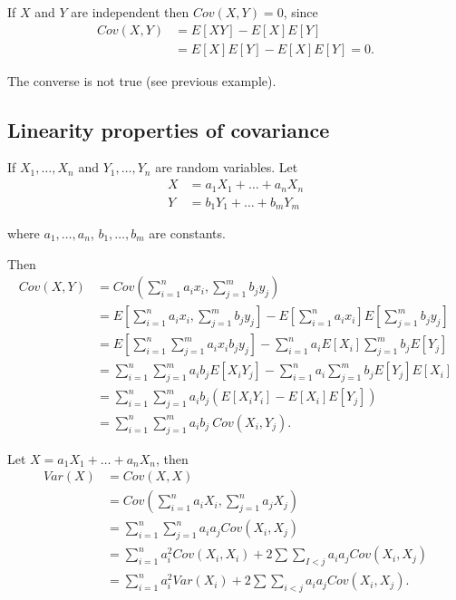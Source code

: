 
If $X$ and $Y$ are independent then $Cov\left( X, Y \right) = 0$, since 
\begin{align*}
	Cov\left( X, Y \right) &= E\left[ XY \right] - E\left[ X \right] E\left[ Y \right]  \\
	&= E\left[ X \right] E\left[ Y \right] - E\left[ X \right]E\left[ Y \right] = 0  
.\end{align*}

The converse is not true (see previous example).

\subsection{Linearity properties of covariance}

If $X_{1} , \ldots , X_{n}$ and $Y_{1} , \ldots , Y_{n}$ are random variables. Let 
\begin{align*}
	X &= a_1 X_1 + \ldots + a_n X_n \\
	Y &= b_1 Y_1 + \ldots + b_{m} Y_{m} 
\end{align*}

where $a_{1} , \ldots , a_{n}$, $b_{1} , \ldots , b_{m}$ are constants. 

Then 
\begin{align*}
	Cov\left( X, Y \right) &= Cov\left( \sum_{i=1}^{n} a_i x_i , \sum_{j=1}^{m} b_{j}y_{j} \right)  \\
	&= E\left[ \sum_{i=1}^{n} a_i x_i , \sum_{j=1}^{m} b_{j}y_{j} \right]  - E\left[ \sum_{i=1}^{n} a_i x_i  \right] E\left[  \sum_{j=1}^{m} b_{j}y_{j} \right]  \\
	&= E\left[ \sum_{i=1}^{n} \sum_{j=1}^{m} a_i x_i b_{j}y_{j} \right] - \sum_{i=1}^{n} a_{i}E\left[ X_{i} \right] \sum_{j=1}^{m} b_{j}E\left[ Y_{j} \right]  \\
	&= \sum_{i=1}^{n} \sum_{j=1}^{m} a_i  b_{j} E\left[ X_{i}Y_{j} \right]  -  \sum_{i=1}^{n} a_{i}\sum_{j=1}^{m} b_{j}E\left[ Y_{j} \right]E\left[ X_{i} \right] \\
	&=  \sum_{i=1}^{n} \sum_{j=1}^{m} a_i  b_{j}  \left( E\left[ X_{i}Y_{i} \right]  - E\left[ X_i \right] E \left[ Y_j \right]  \right) \\
	&= \sum_{i=1}^{n} \sum_{j=1}^{m} a_i  b_{j}\ Cov \left( X_i, Y_j \right) 
.\end{align*}

\begin{eg}
	Let $X = a_1 X_1 + \ldots + a_n X_n$, then 
	\begin{align*}
		Var\left( X \right) &=  Cov\left( X, X \right)  \\
				    &= Cov\left( \sum_{i=1}^{n} a_i X_i , \sum_{j=1}^{n} a_{j}X_{j} \right)  \\
				    &= \sum_{i=1}^{n} \sum_{j=1}^{n} a_i a_j Cov\left( X_{i}, X_j \right)  \\
				    &= \sum_{i=1}^{n} a_{i}^{2}Cov\left( X_i , X_i  \right) + 2\sum \sum_{I < j}^{} a_i a_j Cov \left( X_i, X_j \right)  \\
				    &= \sum_{i=1}^{n} a_i ^2 Var \left( X_i \right)  + 2 \sum \sum_{i < j}a_i a_j Cov\left( X_i, X_j \right) 
	.\end{align*}
\end{eg}

